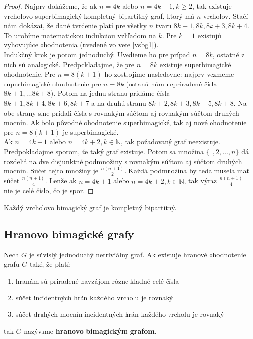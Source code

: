 \begin{proof} Najprv dokážeme, že ak $n = 4k$ alebo $n = 4k-1, k \geq 2$, tak existuje vrcholovo superbimagický kompletný bipartitný graf, ktorý má $n$ vrcholov. Stačí nám dokázať, že dané tvrdenie platí pre všetky $n$ tvaru $8k-1, 8k, 8k+3, 8k+4$. To urobíme matematickou indukciou vzhľadom na $k$. Pre $k = 1$ existujú vyhovujúce ohodnotenia (uvedené vo vete \ref{vsbg1}). \\

Indukčný krok je potom jednoduchý. Uvedieme ho pre prípad $n = 8k$, ostatné z nich sú analogické. Predpokladajme, že pre $n = 8k$ existuje superbimagické ohodnotenie. Pre $n = 8(k+1)$ ho zostrojíme nasledovne: najprv vezmeme superbimagické ohodnotenie pre $n = 8k$ (ostanú nám nepriradené čísla $8k+1, \dots 8k+8$). Potom na jednu stranu pridáme čísla $8k+1, 8k+4, 8k+6, 8k+7$ a na druhú stranu $8k+2, 8k+3, 8k+5, 8k+8$. Na obe strany sme pridali čísla s rovnakým súčtom aj rovnakým súčtom druhých mocnín. Ak bolo pôvodné ohodnotenie superbimagické, tak aj nové ohodnotenie pre $n = 8(k+1)$ je superbimagické. \\

Ak $n = 4k+1$ alebo $n = 4k+2, k \in \mathbb{N}$, tak požadovaný graf neexistuje. Predpokladajme sporom, že taký graf existuje. Potom sa množina $\{1, 2, \dots , n\}$ dá rozdeliť na dve disjunktné podmnožiny s rovnakým súčtom aj súčtom druhých mocnín. Súčet tejto množiny je $\frac{n(n+1)}{2}$. Každá podmnožina by teda musela mať súčet $\frac{n(n+1)}{4}$. Lenže ak  $n = 4k+1$ alebo $n = 4k+2, k \in \mathbb{N}$, tak výraz $\frac{n(n+1)}{4}$ nie je celé číslo, čo je spor.
\end{proof}

\begin{hypothesis} Každý vrcholovo bimagický graf je kompletný bipartitný.
\end{hypothesis}



\subsection{Hranovo bimagické grafy}

\begin{definition} Nech $G$ je súvislý jednoduchý netriviálny graf. Ak existuje hranové ohodnotenie grafu $G$ také, že platí:

\begin{enumerate}
\item hranám sú priradené navzájom rôzne kladné celé čísla
\item súčet incidentných hrán každého vrcholu je rovnaký
\item súčet druhých mocnín incidentných hrán každého vrcholu je rovnaký
\end{enumerate}

tak $G$ nazývame \textbf{hranovo bimagickým grafom}.
\end{definition} 

